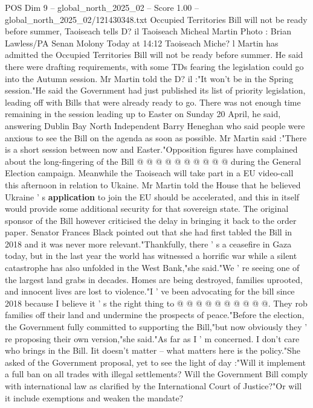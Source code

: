 \begin{textsample}{POS Dim 9 – global\_north\_2025\_02 – Score 1.00 – global\_north\_2025\_02/121430348.txt}  \label{ex:f9_pos_392}
Occupied Territories Bill will not be ready before summer, Taoiseach tells D? il Taoiseach Micheal Martin Photo : Brian Lawless/PA Senan Molony Today at 14:12 Taoiseach Miche? l Martin has admitted the Occupied Territories Bill will not be ready before summer.
He said there were drafting requirements, with some TDs fearing the legislation could go into the Autumn session.
Mr Martin told the D? il :"It won't be in the Spring session."He said the Government had just published its list of priority legislation, leading off with Bills that were already ready to go.
There was not enough time remaining in the session leading up to Easter on Sunday 20 April, he said, answering Dublin Bay North Independent Barry Heneghan who said people were anxious to see the Bill on the agenda as soon as possible.
Mr Martin said :"There is a short session between now and Easter."Opposition figures have complained about the long-fingering of the Bill @ @ @ @ @ @ @ @ @ @ during the General Election campaign.
Meanwhile the Taoiseach will take part in a EU video-call this afternoon in relation to Ukaine.
Mr Martin told the House that he believed Ukraine ' s \textbf{application} to join the EU should be accelerated, and this in itself would provide some additional security for that sovereign state.
The original sponsor of the Bill however criticised the delay in bringing it back to the order paper.
Senator Frances Black pointed out that she had first tabled the Bill in 2018 and it was never more relevant."Thankfully, there ' s a ceasefire in Gaza today, but in the last year the world has witnessed a horrific war while a silent catastrophe has also unfolded in the West Bank,"she said."We ' re seeing one of the largest land grabs in decades.
Homes are being destroyed, families uprooted, and innocent lives are lost to violence."I ' ve been advocating for the bill since 2018 because I believe it ' s the right thing to @ @ @ @ @ @ @ @ @ @.
They rob families off their land and undermine the prospects of peace."Before the election, the Government fully committed to supporting the Bill,"but now obviously they ' re proposing their own version,"she said."As far as I ' m concerned.
I don't care who brings in the Bill.
Iit doesn't matter -- what matters here is the policy."She asked of the Government proposal, yet to see the light of day :"Will it implement a full ban on all trades with illegal settlements?
Will the Government Bill comply with international law as clarified by the International Court of Justice?"Or will it include exemptions and weaken the mandate?

\end{textsample}
